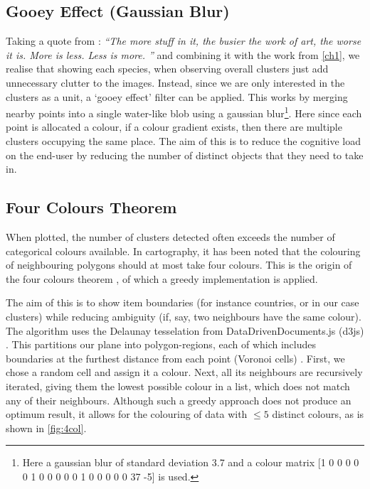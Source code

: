 \subsection{Gooey Effect (Gaussian Blur)}
Taking a quote from \cite{lessmore}:
\emph{``The more stuff in it, the busier the work of art, the worse it is. More is less. Less is more. %
''} and combining it with the work from \autoref{ch1}, we realise that showing each species, when observing overall clusters just add unnecessary clutter to the images. Instead, since we are only interested in the clusters as a unit, a `gooey effect' filter can be applied. This works by merging nearby points into a single water-like blob using a gaussian blur\footnote{Here a gaussian blur of standard deviation 3.7 and a colour matrix [1 0 0 0 0  0 1 0 0 0  0 0 1 0 0  0 0 0 37 -5] is used.}. Here since each point is allocated a colour, if a colour gradient exists, then there are multiple clusters occupying the same place. The aim of this is to reduce the cognitive load on the end-user by reducing the number of distinct objects that they need to take in.



\subsection{Four Colours Theorem}\label{sec:4col}
When plotted, the number of clusters detected often exceeds the number of categorical colours available. In cartography, it has been noted that the colouring of neighbouring polygons should at most take four colours. This is the origin of the four colours theorem \cite{fourcolour}, of which a greedy implementation is applied.

The aim of this is to show item boundaries (for instance countries, or in our case clusters) while reducing ambiguity (if, say, two neighbours have the same colour). The algorithm uses the Delaunay tesselation from DataDrivenDocuments.js (d3js) \cite{d3js}. This partitions our plane into polygon-regions, each of which includes boundaries at the furthest distance from each point (Voronoi cells) \cite{delaunay}. First, we chose a random cell and assign it a colour.
Next, all its neighbours are recursively iterated, giving them the lowest possible colour in a list, which does not match any of their neighbours. Although such a greedy approach does not produce an optimum result, it allows for the colouring of data with $\le 5$ distinct colours, as is shown in \autoref{fig:4col}.


